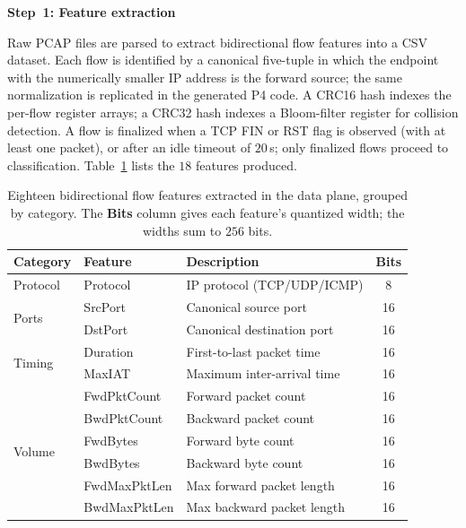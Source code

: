 \documentclass[runningheads]{llncs}
\begin{document}
\noindent\textbf{Step~1: Feature extraction}

Raw PCAP files are parsed to extract bidirectional flow features into a CSV dataset. Each flow is identified by a canonical five-tuple in which the endpoint with the numerically smaller IP address is the forward source; the same normalization is replicated in the generated P4 code. A CRC16 hash indexes the per-flow register arrays; a CRC32 hash indexes a Bloom-filter register for collision detection. A flow is finalized when a TCP FIN or RST flag is observed (with at least one packet), or after an idle timeout of $20$\,s; only finalized flows proceed to classification. Table~\ref{tab:features} lists the $18$ features produced.

\begin{table}[!t]
\centering
\caption{Eighteen bidirectional flow features extracted in the data plane, grouped by category. The \textbf{Bits} column gives each feature's quantized width; the widths sum to $256$ bits.}
\label{tab:features}
\renewcommand{\arraystretch}{1.1}
\setlength{\tabcolsep}{4pt}
\begin{tabular}{lllc}
\toprule
\textbf{Category} & \textbf{Feature} & \textbf{Description} & \textbf{Bits} \\
\midrule
Protocol  & Protocol         & IP protocol (TCP/UDP/ICMP)         & 8  \\
\midrule
\multirow{2}{*}{Ports}
          & SrcPort          & Canonical source port              & 16 \\
          & DstPort          & Canonical destination port         & 16 \\
\midrule
\multirow{2}{*}{Timing}
          & Duration         & First-to-last packet time          & 16 \\
          & MaxIAT           & Maximum inter-arrival time         & 16 \\
\midrule
\multirow{6}{*}{Volume}
          & FwdPktCount      & Forward packet count               & 16 \\
          & BwdPktCount      & Backward packet count              & 16 \\
          & FwdBytes         & Forward byte count                 & 16 \\
          & BwdBytes         & Backward byte count                & 16 \\
          & FwdMaxPktLen     & Max forward packet length          & 16 \\
          & BwdMaxPktLen     & Max backward packet length         & 16 \\

\end{tabular}
\end{table}
\end{document}
